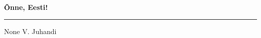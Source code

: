 \documentclass[10pt]{book}
\begin{document}
{
  \samepage
  \raggedbottom
  \raggedright
  \sloppy


  \vspace{0.2in}

  \noindent\begin{minipage}{.1\textwidth}
    \hfill\vspace{0.1in}
  \end{minipage}%
  \noindent\begin{minipage}{.8\textwidth}
    \centering
    \bfseries
    \large \~Onne, Eesti!
  \end{minipage}%
  \noindent\begin{minipage}{.1\textwidth}
      \hfill\vspace{0.1in}
  \end{minipage}

  \nopagebreak[4]
  \vspace{0.1in}
  \nopagebreak[4]
  \hrule height 0.05ex
  \nopagebreak[4]
  \vspace{-0.05in}

  {\footnotesize None \hfill V. Juhandi }\\
  \vspace{0.01in}



}
\end{document}
